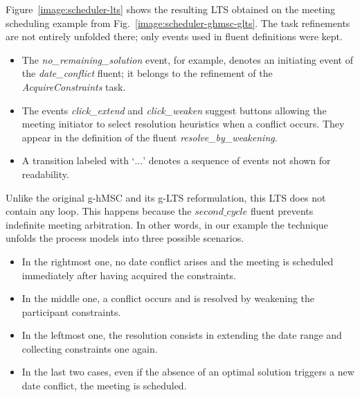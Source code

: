 Figure~\ref{image:scheduler-lts} shows the resulting LTS obtained on the meeting scheduling example from Fig.~\ref{image:scheduler-ghmsc-glts}. The task refinements are not entirely unfolded there; only events used in fluent definitions were kept.
\begin{itemize}
\item The \emph{no\_remaining\_solution} event, for example, denotes an initiating event of the \emph{date\_conflict} fluent; it belongs to the refinement of the \emph{AcquireConstraints} task. 
\item The events \emph{click\_extend} and \emph{click\_weaken} suggest buttons allowing the meeting initiator to select resolution heuristics when a conflict occurs. They appear in the definition of the fluent \emph{resolve\_by\_weakening}. 
\item A transition labeled with `$\ldots$' denotes a sequence of events not shown for readability.
\end{itemize}

Unlike the original g-hMSC and its g-LTS reformulation, this LTS does not contain any loop. This happens because the $second\_cycle$ fluent prevents indefinite meeting arbitration. In other words, in our example the technique unfolds the process models into three possible scenarios. 
\begin{itemize}
\item In the rightmost one, no date conflict arises and the meeting is scheduled immediately after having acquired the constraints. 
\item In the middle one, a conflict occurs and is resolved by weakening the participant constraints. 
\item In the leftmost one, the resolution consists in extending the date range and collecting constraints one again. \item In the last two cases, even if the absence of an optimal solution triggers a new date conflict, the meeting is scheduled. 
\end{itemize}

